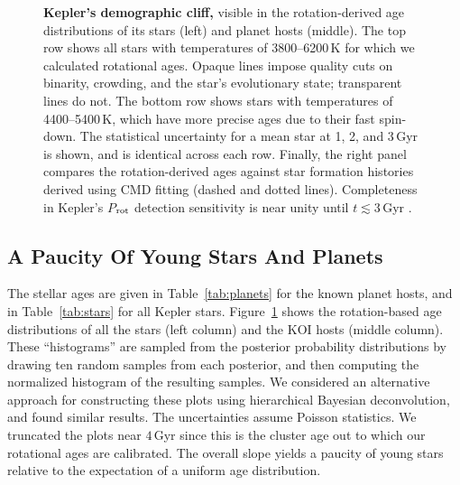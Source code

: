 \documentclass[11pt,twocolumn,tighten,linenumbers]{aastex63}
\begin{document}
\begin{figure}[!t]
  \begin{center}
    \leavevmode

	\vspace{-0.35cm}
  \end{center}
  \vspace{-0.66cm}
  \caption{{\bf Kepler's demographic cliff,} visible in the
  rotation-derived age distributions of its stars (left) and planet
  hosts (middle).  The top row shows all stars with temperatures of
  3800--6200\,K for which we calculated rotational ages.  Opaque lines
  impose quality cuts on binarity, crowding, and the star's
  evolutionary state; transparent lines do not.  The bottom row shows
  stars with temperatures of 4400--5400\,K, which have more precise
  ages due to their fast spin-down.  The statistical uncertainty for a
  mean star at 1, 2, and 3\,Gyr is shown, and is identical across each
  row.  Finally, the right panel compares the rotation-derived ages
  against star formation histories derived using CMD fitting (dashed
  and dotted lines).  Completeness in Kepler's $P$$_{\rm rot}$
  detection sensitivity is near unity until $t$$\lesssim$3\,Gyr
  \citep{2022ApJ...937...94M}.
  \label{fig:hist_tgyro}
  }
\end{figure}


\subsection{A Paucity Of Young Stars And Planets}

The stellar ages are given in Table~\ref{tab:planets} for the known
planet hosts, and in Table~\ref{tab:stars} for all Kepler stars.
Figure~\ref{fig:hist_tgyro} shows the rotation-based age distributions
of all the stars (left column) and the KOI hosts (middle column).
These ``histograms'' are sampled from the posterior probability
distributions by drawing ten random samples from each posterior, and
then computing the normalized histogram of the resulting samples.
We considered an alternative approach for constructing these
plots using hierarchical Bayesian deconvolution, and found similar results.
The uncertainties assume Poisson statistics.  We truncated the plots
near $4$\,Gyr since this is the cluster age out to which our
rotational ages are calibrated.  The overall slope yields a paucity of
young stars relative to the expectation of a uniform age distribution.
\end{document}
